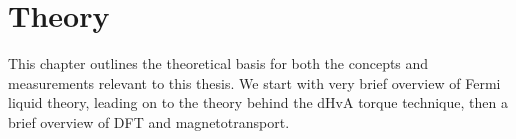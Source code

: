 \chapter{Theory}

\begin{chapterabstract}
This chapter outlines the theoretical basis for both the concepts and measurements relevant to this thesis. We start with very brief overview of Fermi liquid theory, leading on to the theory behind the \ac{dHvA} torque technique, then a brief overview of \ac{DFT} and magnetotransport.
\end{chapterabstract}











